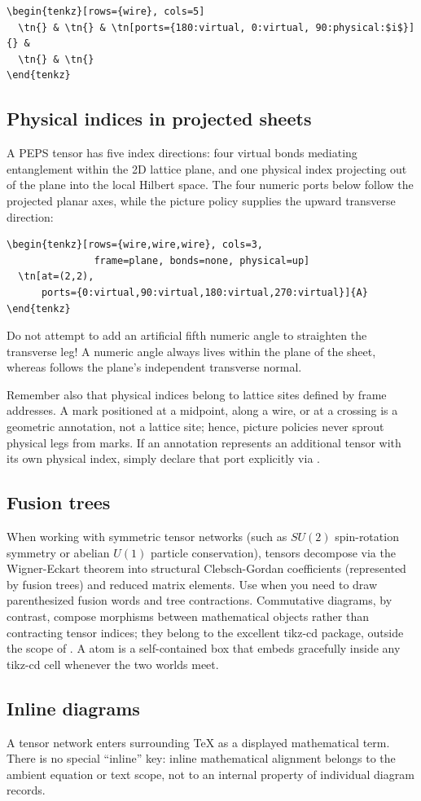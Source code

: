 \begin{Verbatim}[fontsize=\small,frame=leftline]
\begin{tenkz}[rows={wire}, cols=5]
  \tn{} & \tn{} & \tn[ports={180:virtual, 0:virtual, 90:physical:$i$}]{} &
  \tn{} & \tn{}
\end{tenkz}
\end{Verbatim}

\subsection{Physical indices in projected sheets}

A PEPS tensor has five index directions: four virtual bonds mediating
entanglement within the 2D lattice plane, and one physical index projecting out
of the plane into the local Hilbert space.  The four numeric ports below follow
the projected planar axes, while the picture policy supplies the upward
transverse direction:

\begin{Verbatim}[fontsize=\small,frame=leftline]
\begin{tenkz}[rows={wire,wire,wire}, cols=3,
               frame=plane, bonds=none, physical=up]
  \tn[at=(2,2),
      ports={0:virtual,90:virtual,180:virtual,270:virtual}]{A}
\end{tenkz}
\end{Verbatim}

Do not attempt to add an artificial fifth numeric angle to straighten the
transverse leg!  A numeric angle always lives within the plane of the sheet,
whereas  follows the plane's independent transverse normal.

Remember also that physical indices belong to lattice sites defined by frame
addresses.  A mark positioned at a midpoint, along a wire, or at a crossing is a
geometric annotation, not a lattice site; hence, picture policies never sprout
physical legs from marks.  If an annotation represents an additional tensor with
its own physical index, simply declare that port explicitly via .

\subsection{Fusion trees}

When working with symmetric tensor networks (such as $SU(2)$ spin-rotation
symmetry or abelian $U(1)$ particle conservation), tensors decompose via the
Wigner-Eckart theorem into structural Clebsch-Gordan coefficients (represented
by fusion trees) and reduced matrix elements.  Use  when you need
to draw parenthesized fusion words and tree contractions.  Commutative diagrams,
by contrast, compose morphisms between mathematical objects rather than
contracting tensor indices; they belong to the excellent \textsf{tikz-cd}
package, outside the scope of \pkg{}.  A  atom is a
self-contained box that embeds gracefully inside any \textsf{tikz-cd} cell
whenever the two worlds meet.

\subsection{Inline diagrams}

A \pkg{} tensor network enters surrounding \TeX{} as a displayed mathematical
term.  There is no special ``inline'' key: inline mathematical alignment
belongs to the ambient equation or text scope, not to an internal property of
individual diagram records.
